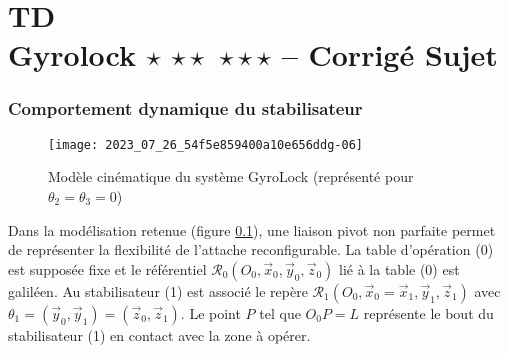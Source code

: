 \chapter*{TD  \\ 
Gyrolock  \ifnormal $\star$ \else \fi \ifdifficile $\star\star$ \else \fi \iftdifficile $\star\star\star$ \else \fi
-- \ifprof Corrigé \else Sujet \fi}

\iflivret {} \else
\ifprof  {} \else \fi
\fi

\setcounter{question}{0}

\ifprof  {}\else \fi

\subsection{\label{sec:II.C} Comportement dynamique du stabilisateur}

\begin{figure}[!h]
\centering
\texttt{[image: 2023\_07\_26\_54f5e859400a10e656ddg-06]}
\caption{\label{fig:09}Modèle cinématique du système GyroLock (représenté pour $\theta_{2}=\theta_{3}=0$)}
\end{figure}

Dans la modélisation retenue (figure \ref{fig:09}), une liaison pivot non parfaite permet de représenter la flexibilité de l'attache reconfigurable. La table d'opération (0) est supposée fixe et le référentiel $\mathcal{R}_{0}\left(O_{0}, \vec{x}_{0}, \vec{y}_{0}, \vec{z}_{0}\right)$ lié à la table (0) est galiléen. Au stabilisateur (1) est associé le repère $\mathcal{R}_{1}\left(O_{0}, \vec{x}_{0}=\vec{x}_{1}, \vec{y}_{1}, \vec{z}_{1}\right)$ avec $\theta_{1}=\left(\vec{y}_{0}, \vec{y}_{1}\right)=\left(\vec{z}_{0}, \vec{z}_{1}\right)$. Le point $P$ tel que $O_{0} P=L$ représente le bout du stabilisateur (1) en contact avec la zone à opérer.

